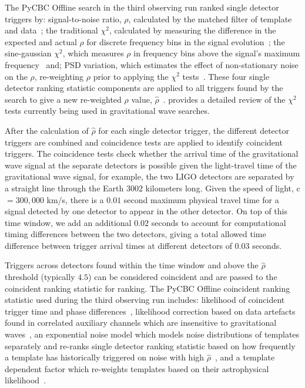 The PyCBC Offline search in the third observing run ranked single detector triggers by: signal-to-noise ratio, $\rho$, calculated by the matched filter of template and data~\cite{FINDCHIRP:2012}; the traditional $\chi^{2}$, calculated by measuring the difference in the expected and actual $\rho$ for discrete frequency bins in the signal evolution~\cite{Allen_Chi:2005}; the sine-gaussian $\chi^{2}$, which measures $\rho$ in frequency bins above the signal's maximum frequency~\cite{PyCBC_sg:2018} and; PSD variation, which estimates the effect of non-stationary noise on the $\rho$, re-weighting $\rho$ prior to applying the $\chi^{2}$ tests~\cite{PSD_var:2020}. These four single detector ranking statistic components are applied to all triggers found by the search to give a new re-weighted $\rho$ value, $\hat{\rho}$~\cite{rw_snr_eq:2012}. \cite{McIsaac_Chi:2022} provides a detailed review of the $\chi^{2}$ tests currently being used in gravitational wave searches.

After the calculation of $\hat{\rho}$ for each single detector trigger, the different detector triggers are combined and coincidence tests are applied to identify coincident triggers. The coincidence tests check whether the arrival time of the gravitational wave signal at the separate detectors is possible given the light-travel time of the gravitational wave signal, for example, the two LIGO detectors are separated by a straight line through the Earth $3002$ kilometers long. Given the speed of light, c $= 300,000$ km/s, there is a $0.01$ second maximum physical travel time for a signal detected by one detector to appear in the other detector. On top of this time window, we add an additional $0.02$ seconds to account for computational timing differences between the two detectors, giving a total allowed time difference between trigger arrival times at different detectors of $0.03$ seconds.

Triggers across detectors found within the time window and above the $\hat{\rho}$ threshold (typically $4.5$) can be considered coincident and are passed to the coincident ranking statistic for ranking. The PyCBC Offline coincident ranking statistic used during the third observing run includes: likelihood of coincident trigger time and phase differences~\cite{PyCBC:2016}, likelihood correction based on data artefacts found in correlated auxiliary channels which are insensitive to gravitational waves~\cite{DQ_vetoes:2017, iDQ:2020}, an exponential noise model which models noise distributions of templates separately and re-ranks single detector ranking statistic based on how frequently a template has historically triggered on noise with high $\hat{\rho}$~\cite{PyCBC:2017}, and a template dependent factor which re-weights templates based on their astrophysical likelihood~\cite{PyCBC_focussed_bbh:2024}.


